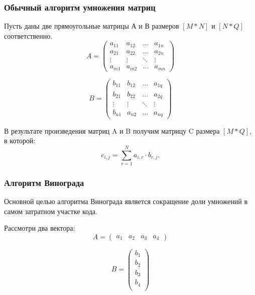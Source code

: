 \documentclass[12pt,a4paper]{article}
\numberwithin{equation}{section}
\begin{document}
\subsubsection{Обычный алгоритм умножения матриц}
\qquad Пусть даны две прямоугольные матрицы А и В размеров $[M * N]$ и $[N * Q]$ соответственно.
\begin{equation*}
A = \left(
\begin{array}{cccc}
a_{11} & a_{12} & \ldots & a_{1n}\\
a_{21} & a_{22} & \ldots & a_{2n}\\
\vdots & \vdots & \ddots & \vdots\\
a_{m1} & a_{m2} & \ldots & a_{mn}
\end{array}
\right)
\end{equation*}

\begin{equation*}
B = \left(
\begin{array}{cccc}
b_{11} & b_{12} & \ldots & a_{1q}\\
b_{21} & b_{22} & \ldots & a_{2q}\\
\vdots & \vdots & \ddots & \vdots\\
b_{n1} & a_{n2} & \ldots & a_{nq}
\end{array}
\right)
\end{equation*}

\qquad В результате произведения матриц A и B получим матрицу C размера $[M *  Q]$, в которой:
\begin{equation}
	c_{i,j} = \sum\limits_{r=1}^N a_{i,r}\cdot b_{r,j}.
\end{equation}

\newpage

\subsubsection{Алгоритм Винограда}
\qquad Основной целью алгоритма Винограда является сокращение доли умножений в самом затратном участке кода.

\qquad Рассмотри два вектора:
\begin{equation*}
A = \left(
\begin{array}{cccc}
a_{1} & a_{2} & a_{3} & a_{4}
\end{array}
\right)
\end{equation*}

\begin{equation*}
B = \left(
\begin{array}{c}
b_{1}\\
b_{2}\\
b_{3}\\
b_{4}\\
\end{array}
\right)
\end{equation*}
\end{document}
